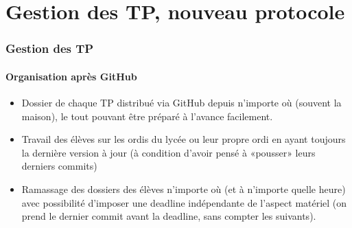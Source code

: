 \section{Gestion des TP, nouveau protocole}

\begin{frame}
	\frametitle{Gestion des TP}
	\framesubtitle{Organisation après GitHub}

	\begin{itemize}[<+->]
		\item	 Dossier de chaque TP distribué via GitHub depuis n'importe où (souvent la maison), le tout pouvant être préparé à l'avance facilement.

		\item  Travail des élèves sur les ordis du lycée ou leur propre ordi en ayant toujours la dernière version à jour (à condition d'avoir pensé à «pousser» leurs derniers commits)

		\item Ramassage des dossiers des élèves n'importe où (et à n'importe quelle heure) avec possibilité d'imposer une deadline indépendante de l'aspect matériel (on prend le dernier commit avant la deadline, sans compter les suivants).

	\end{itemize}

\end{frame}


